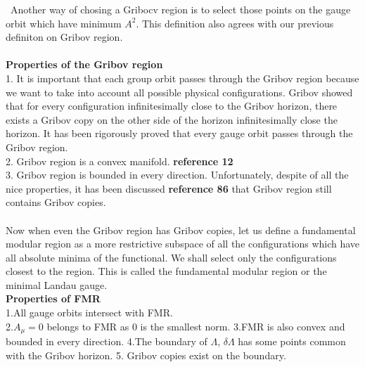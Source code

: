 \begin{description}
\ Another way of chosing a Gribocv region is to select those points on the gauge orbit which have minimum $A^{2}$. This definition also agrees with our previous definiton on Gribov region.
\\
\\
\textbf{Properties of the Gribov region}\\
1. It is important that each group orbit passes through the Gribov region because we want to take into account all possible physical configurations. Gribov showed that for every configuration infinitesimally close to the Gribov horizon, there exists a Gribov copy on the other side of the horizon infinitesimally close the horizon. It has been rigorously proved that every gauge orbit passes through the Gribov region.\\
2. Gribov region is a convex manifold. \textbf{reference 12}\\
3. Gribov region is bounded in every direction.
Unfortunately, despite of all the nice properties, it has been discussed \textbf{reference 86} that Gribov region still contains Gribov copies.
\\
\\
Now when even the Gribov region has Gribov copies, let us define a fundamental modular region as a more restrictive subspace of all the configurations which have all absolute minima of the functional. We shall select only the configurations closest to the region. This is called the fundamental modular region or the minimal Landau gauge. 
\\
\textbf{Properties of FMR}\\
1.All gauge orbits intersect with FMR.\\
2.$ A_{\mu}=0 $ belongs to FMR as 0 is the smallest norm.
3.FMR is also convex and bounded in every direction.
4.The boundary of $\Lambda$, $\delta \Lambda$ has some points common with the Gribov horizon.
5. Gribov copies exist on the boundary.


\end{description}
